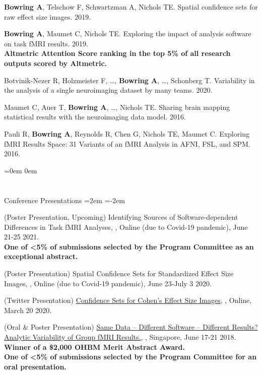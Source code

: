 \documentclass{my_cv}
\begin{document}
\textbf{Bowring A}, Telschow F, Schwartzman A, Nichols TE. Spatial confidence sets for raw effect size images.  2019. 

\textbf{Bowring A}, Maumet C, Nichols TE. Exploring the impact of analysis software on task fMRI results.  2019.\\
\textbf{Altmetric Attention Score ranking in the top 5\% of all research outputs scored by Altmetric.}

Botvinik-Nezer R, Holzmeister  F, \dots, \textbf{Bowring A}, \dots, Schonberg T. Variability in the analysis of a single neuroimaging dataset by many teams.  2020. 

Maumet C, Auer T, \textbf{Bowring A}, \dots, Nichols TE. Sharing brain mapping statistical results with the neuroimaging data model.  2016.

Pauli R, \textbf{Bowring A}, Reynolds R, Chen G, Nichols TE, Maumet C. Exploring fMRI Results Space: 31 Variants of an fMRI Analysis in AFNI, FSL, and SPM.  2016.

\leftskip=0em
\parindent 0em

\section{\faBarChart}{Conference Presentations}
\leftskip=2em
\parindent=-2em

\hspace{-2em}(Poster Presentation, Upcoming) Identifying Sources of Software-dependent Differences in Task fMRI Analyses, , Online (due to Covid-19 pandemic), June 21-25 2021.\\
\textbf{One of <5\% of submissions selected by the Program Committee as an exceptional abstract. }

(Poster Presentation) Spatial Confidence Sets for Standardized Effect Size Images, , Online (due to Covid-19 pandemic), June 23-July 3 2020. 

(Twitter Presentation) \href{https://twitter.com/OHBMequinoX/status/1240926466302500864}{Confidence Sets for Cohen’s  Effect Size Images}, , Online, March 20 2020. 

(Oral \& Poster Presentation) \href{https://www.pathlms.com/ohbm/courses/8246/sections/12541/video_presentations/116000}{Same Data – Different Software – Different Results? Analytic Variability of Group fMRI Results.}, , Singapore, June 17-21 2018. \\
\textbf{Winner of a \$2,000 OHBM Merit Abstract Award.} \\
\textbf{One of <5\% of submissions selected by the Program Committee for an oral presentation. }
\end{document}
